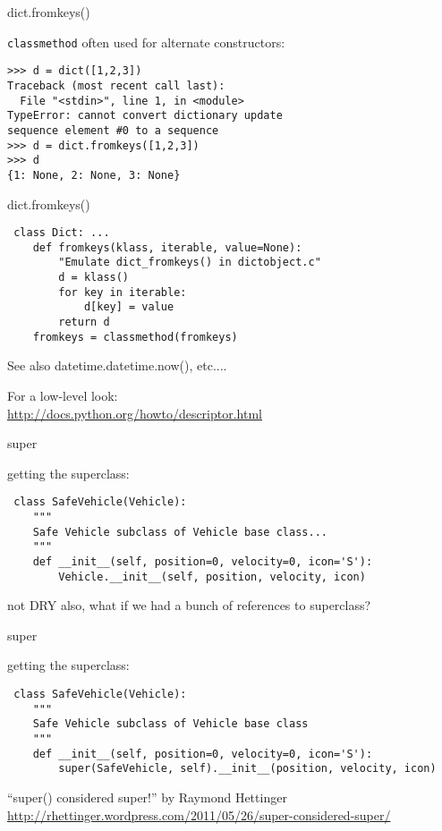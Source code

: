 \documentclass{beamer}
\begin{document}
\begin{frame}[fragile]{dict.fromkeys()}

{ \Large \verb|classmethod| often used for alternate constructors:}

\begin{verbatim}
>>> d = dict([1,2,3])
Traceback (most recent call last):
  File "<stdin>", line 1, in <module>
TypeError: cannot convert dictionary update
sequence element #0 to a sequence
>>> d = dict.fromkeys([1,2,3])
>>> d
{1: None, 2: None, 3: None}
\end{verbatim}

\end{frame} 

\begin{frame}[fragile]{dict.fromkeys()}

\begin{verbatim}
￼class Dict: ...
    def fromkeys(klass, iterable, value=None):
        "Emulate dict_fromkeys() in dictobject.c"
        d = klass()
        for key in iterable:
            d[key] = value
        return d
    fromkeys = classmethod(fromkeys)
\end{verbatim}

\vfill
{\Large See also datetime.datetime.now(), etc....}

\vfill
For a low-level look:\\
\url{http://docs.python.org/howto/descriptor.html}

\end{frame} 

\begin{frame}[fragile]{super}

{\Large getting the superclass:}
\begin{verbatim}
￼class SafeVehicle(Vehicle):
    """
    Safe Vehicle subclass of Vehicle base class...
    """
    def __init__(self, position=0, velocity=0, icon='S'):
        Vehicle.__init__(self, position, velocity, icon)
\end{verbatim}

{\Large
\vfill
not DRY
\vfill
also, what if we had a bunch of references to superclass?
}
\end{frame} 

\begin{frame}[fragile]{super}

{\Large getting the superclass:}
\begin{verbatim}
￼class SafeVehicle(Vehicle):
    """
    Safe Vehicle subclass of Vehicle base class
    """
    def __init__(self, position=0, velocity=0, icon='S'):
        super(SafeVehicle, self).__init__(position, velocity, icon)
\end{verbatim}

\vfill
{\Large ``super() considered super!'' by Raymond Hettinger }
\vfill
\url{http://rhettinger.wordpress.com/2011/05/26/super-considered-super/}

\end{frame} 
\end{document}
